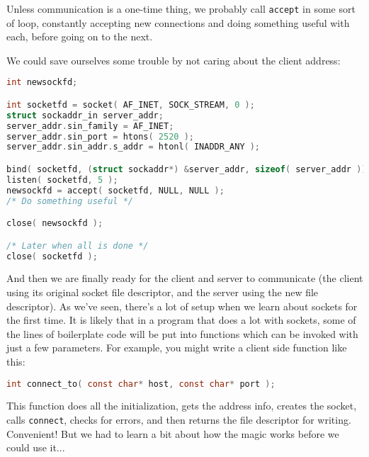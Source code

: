 Unless communication is a one-time thing, we probably call \texttt{accept} in some sort of loop, constantly accepting new connections and doing something useful with each, before going on to the next.

We could save ourselves some trouble by not caring about the client address:

\begin{lstlisting}[language=C]
int newsockfd;

int socketfd = socket( AF_INET, SOCK_STREAM, 0 );
struct sockaddr_in server_addr;
server_addr.sin_family = AF_INET;
server_addr.sin_port = htons( 2520 );
server_addr.sin_addr.s_addr = htonl( INADDR_ANY );

bind( socketfd, (struct sockaddr*) &server_addr, sizeof( server_addr ));
listen( socketfd, 5 );
newsockfd = accept( socketfd, NULL, NULL );
/* Do something useful */

close( newsockfd );

/* Later when all is done */
close( socketfd );
\end{lstlisting}

And then we are finally ready for the client and server to communicate (the client using its original socket file descriptor, and the server using the new file descriptor). As we've seen, there's a lot of setup when we learn about sockets for the first time. It is likely that in a program that does a lot with sockets, some of the lines of boilerplate code will be put into functions which can be invoked with just a few parameters. For example, you might write a client side function like this:

\begin{lstlisting}[language=C]
int connect_to( const char* host, const char* port ); 
\end{lstlisting}

This function does all the initialization, gets the address info, creates the socket, calls \texttt{connect}, checks for errors, and then returns the file descriptor for writing. Convenient! But we had to learn a bit about how the magic works before we could use it...



